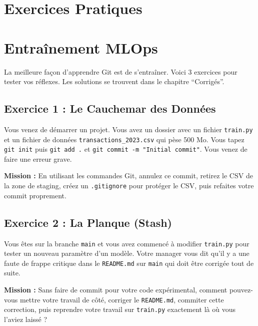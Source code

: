 \documentclass[
  letterpaper,
  DIV=11,
  numbers=noendperiod]{scrreprt}
\begin{document}

\section{Exercices Pratiques}\label{exercices-pratiques}


\section{Entraînement MLOps}\label{entrauxeenement-mlops}

La meilleure façon d'apprendre Git est de s'entraîner. Voici 3 exercices
pour tester vos réflexes. Les solutions se trouvent dans le chapitre
``Corrigés''.

\subsection{Exercice 1 : Le Cauchemar des
Données}\label{exercice-1-le-cauchemar-des-donnuxe9es}

Vous venez de démarrer un projet. Vous avez un dossier avec un fichier
\texttt{train.py} et un fichier de données
\texttt{transactions\_2023.csv} qui pèse 500 Mo. Vous tapez
\texttt{git\ init} puis \texttt{git\ add\ .} et
\texttt{git\ commit\ -m\ "Initial\ commit"}. Vous venez de faire une
erreur grave.

\textbf{Mission :} En utilisant les commandes Git, annulez ce commit,
retirez le CSV de la zone de staging, créez un \texttt{.gitignore} pour
protéger le CSV, puis refaites votre commit proprement.

\subsection{Exercice 2 : La Planque
(Stash)}\label{exercice-2-la-planque-stash}

Vous êtes sur la branche \texttt{main} et vous avez commencé à modifier
\texttt{train.py} pour tester un nouveau paramètre d'un modèle. Votre
manager vous dit qu'il y a une faute de frappe critique dans le
\texttt{README.md} sur \texttt{main} qui doit être corrigée tout de
suite.

\textbf{Mission :} Sans faire de commit pour votre code expérimental,
comment pouvez-vous mettre votre travail de côté, corriger le
\texttt{README.md}, commiter cette correction, puis reprendre votre
travail sur \texttt{train.py} exactement là où vous l'aviez laissé ?
\end{document}
